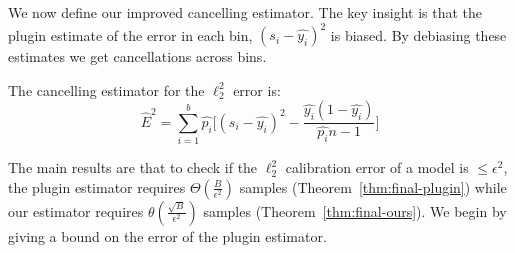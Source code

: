 We now define our improved cancelling estimator. The key insight is that the plugin estimate of the error in each bin, $(s_i - \hat{y_i})^2$ is biased. By debiasing these estimates we get cancellations across bins.
\begin{definition}
The cancelling estimator for the $\ell_2^2$ error is:
\[ \hat{E}^2 = \sum_{i=1}^b \hat{p_i} \Big[ (s_i - \hat{y_i})^2 - \frac{\hat{y_i}(1 - \hat{y_i})}{\hat{p_i}n-1} \Big] \]
\end{definition}

The main results are that to check if the $\ell_2^2$ calibration error of a model is $\leq \epsilon^2$, the plugin estimator requires $\Theta(\frac{B}{\epsilon^2})$ samples (Theorem~\ref{thm:final-plugin}) while our estimator requires $\theta(\frac{\sqrt{B}}{\epsilon^2})$ samples (Theorem~\ref{thm:final-ours}). We begin by giving a bound on the error of the plugin estimator.


 



